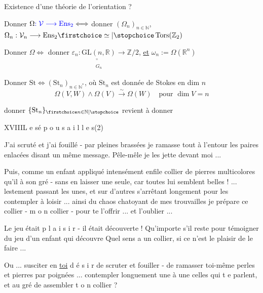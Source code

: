 
  Existence d'une théorie de l'orientation ?

Donner $\Omega{\color{blue}:\mathcal V\longrightarrow\mathrm{Ens}_2}\Longleftrightarrow$ donner $(\Omega_n)_{n\in\mathbb{N}}$, $\Omega_n:\mathcal V_n\longrightarrow\mathrm{Ens}_2\unsure{\simeq}\operatorname{Tors}(\mathbb{Z}_2)$

Donner $\Omega\Longleftrightarrow$ donner $\varepsilon_n:\underset{\substack{\text{''}\\G_n}}{\mathrm{GL}(n,\mathbb{R})}\longrightarrow\mathbb{Z}/2$, \uline{et} $\omega_n:=\Omega(\mathbb{R}^n)$

Donner $\mathrm{St}\Longleftrightarrow(\mathrm{St}_n)_{n\in\mathbb{N}^*}$, où $\mathrm{St}_n$ est donnée de Stokes en dim $n$
\[
\Omega(V,W)\wedge\Omega(V)\xrightarrow{\sim}\Omega(W)\quad\text{pour }\dim V=n
\]

donner $\{\mathrm{St}_n\}_{\unsure{n\in\mathbb{N}}}$ revient à donner

XVIII\qquad L e s\quad é p o u s a i l l e s\qquad (2)

J'ai scruté et j'ai fouillé - par pleines brassées je ramasse tout à l'entour les paires enlacées disant un même message. Pêle-mêle je les jette devant moi ...

Puis, comme un enfant appliqué intensément enfile collier de pierres multicolores qu'il  à son gré - sans en laisser une seule, car toutes lui semblent belles ! ... lestement passant les unes, et sur d'autres s'arrêtant longement pour les contempler à loisir ... ainsi du chaos chatoyant de mes trouvailles je prépare ce collier - m o n collier - pour te l'offrir ... et  l'oublier ...

Le jeu était p l a i s i r - il était découverte ! Qu'importe s'il reste   pour témoigner du jeu  d'un enfant qui découvre \unsure{!} Quel sens a un collier, si ce n'est le plaisir de le faire ...

Ou ... susciter en \uline{toi} d é s i r de scruter et fouiller - de ramasser toi-même perles et pierres par poignées ... contempler longuement une à une celles qui t e parlent, et au gré de    assembler t o n collier ?



